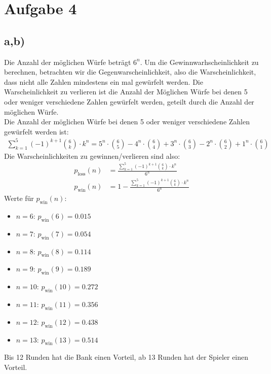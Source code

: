 \documentclass[a4paper]{scrartcl}
\begin{document}
\section*{Aufgabe 4}
\subsection*{a,b)}
Die Anzahl der möglichen Würfe beträgt $6^n$. 
Um die Gewinnwarhscheinlichkeit zu berechnen, betrachten wir die Gegenwarscheinlichkeit, also die Warscheinlichkeit, dass nicht alle Zahlen mindestens ein mal gewürfelt werden.
Die Warscheinlichkeit zu verlieren ist die Anzahl der Möglichen Würfe bei denen 5 oder weniger verschiedene Zahlen gewürfelt werden, geteilt durch die Anzahl der möglichen Würfe. \\
Die Anzahl der möglichen Würfe bei denen 5 oder weniger verschiedene Zahlen gewürfelt werden ist:
\begin{align*}
    \sum_{k=1}^{5} (-1)^{k+1} \binom{6}{k} \cdot k^n = 5^n \cdot \binom{6}{5} - 4^n \cdot \binom{6}{4} + 3^n \cdot \binom{6}{3} - 2^n \cdot \binom{6}{2} + 1^n \cdot \binom{6}{1} 
\end{align*}
Die Warscheinlichkeiten zu gewinnen/verlieren sind also:
\begin{align*}
    p_{\text{loss}}(n) &= \frac{\sum_{k=1}^{5} (-1)^{k+1} \binom{6}{k} \cdot k^n}{6^n} \\
    p_{\text{win}}(n) &= 1 - \frac{\sum_{k=1}^{5} (-1)^{k+1} \binom{6}{k} \cdot k^n}{6^n}
\end{align*}
Werte für $p_{\text{win}}(n)$:
\begin{itemize}
    \item $n = 6$: $p_{\text{win}}(6) = 0.015$
    \item $n = 7$: $p_{\text{win}}(7) = 0.054$
    \item $n = 8$: $p_{\text{win}}(8) = 0.114$
    \item $n = 9$: $p_{\text{win}}(9) = 0.189$
    \item $n = 10$: $p_{\text{win}}(10) = 0.272$
    \item $n = 11$: $p_{\text{win}}(11) = 0.356$
    \item $n = 12$: $p_{\text{win}}(12) = 0.438$
    \item $n = 13$: $p_{\text{win}}(13) = 0.514$
\end{itemize}
Bis 12 Runden hat die Bank einen Vorteil, ab 13 Runden hat der Spieler einen Vorteil.
\end{document}
